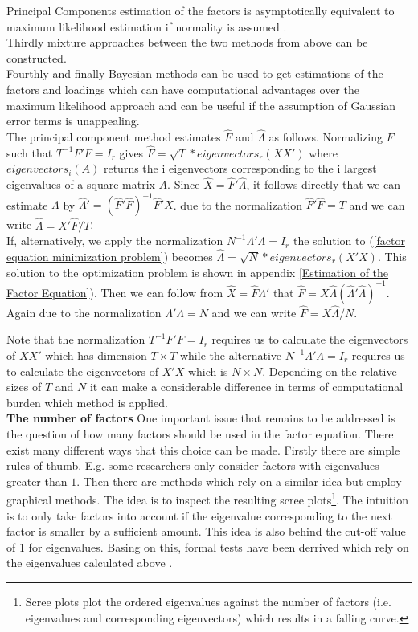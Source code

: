 \documentclass[11pt]{article}
\begin{document}
Principal Components estimation of the factors is asymptotically equivalent to maximum likelihood estimation if normality is assumed \citep{bai2003inferential}. \\
Thirdly mixture approaches between the two methods from above can be constructed. \\
Fourthly and finally Bayesian methods can be used to get estimations of the factors and loadings which can have computational advantages over the maximum likelihood approach and can be useful if the assumption of Gaussian error terms is unappealing. \\

The principal component method estimates $\hat F$ and $\hat \Lambda$ as follows. Normalizing $F$ such that $T^{-1}F'F = I_r$ gives $\hat F = \sqrt{T} * eigenvectors_r(XX')$ where $eigenvectors_i(A)$ returns the i eigenvectors corresponding to the i largest eigenvalues of a square matrix $A$. Since $\hat X = \hat F' \hat \Lambda$, it follows directly that we can estimate $\Lambda$ by $\hat \Lambda' = (\hat F' \hat F)^{-1} \hat F'X$. due to the normalization $\hat F' \hat F = T$ and we can write $\hat \Lambda = X' \hat F / T$. \\
If, alternatively, we apply the normalization $N^{-1}\Lambda'\Lambda = I_r$ the solution to (\ref{factor equation minimization problem}) becomes $\hat \Lambda = \sqrt{N} * eigenvectors_r(X'X)$. This solution to the optimization problem is shown in appendix \ref{Estimation of the Factor Equation}). Then we can follow from $\hat X = \hat F \hat \Lambda'$ that $\hat F = X \hat \Lambda (\hat \Lambda' \hat \Lambda)^{-1}$. Again due to the normalization $\Lambda' \Lambda = N$ and we can write $\hat F = X \hat \Lambda / N$.

Note that the normalization $T^{-1}F'F = I_r$ requires us to calculate the eigenvectors of $XX'$ which has dimension $T \times T$ while the alternative $N^{-1}\Lambda'\Lambda = I_r$ requires us to calculate the eigenvectors of $X'X$ which is $N \times N$. Depending on the relative sizes of $T$ and $N$ it can make a considerable difference in terms of computational burden which method is applied. \\

\textbf{The number of factors}
One important issue that remains to be addressed is the question of how many factors should be used in the factor equation. There exist many different ways that this choice can be made. Firstly there are simple rules of thumb. E.g. some researchers only consider factors with eigenvalues greater than $1$. Then there are methods which rely on a similar idea but employ graphical methods. The idea is to inspect the resulting scree plots\footnote{Scree plots plot the ordered eigenvalues against the number of factors (i.e. eigenvalues and corresponding eigenvectors) which results in a falling curve.}. The intuition is to only take factors into account if the eigenvalue corresponding to the next factor is smaller by a sufficient amount. This idea is also behind the cut-off value of 1 for eigenvalues. Basing on this, formal tests have been derrived which rely on the eigenvalues calculated above \citep{stock2011dynamic}.
\end{document}
